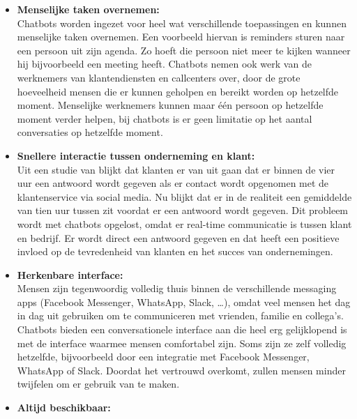 \begin{itemize}
    \item \textbf{Menselijke taken overnemen:} \\
    
    Chatbots worden ingezet voor heel wat verschillende toepassingen en kunnen menselijke taken overnemen. Een voorbeeld hiervan is reminders sturen naar een persoon uit zijn agenda. Zo hoeft die persoon niet meer te kijken wanneer hij bijvoorbeeld een meeting heeft. Chatbots nemen ook werk van de werknemers van klantendiensten en callcenters over, door de grote hoeveelheid mensen die er kunnen geholpen en bereikt worden op hetzelfde moment. Menselijke werknemers kunnen maar één persoon op hetzelfde moment verder helpen, bij chatbots is er geen limitatie op het aantal conversaties op hetzelfde moment. \\
    
    \item \textbf{Snellere interactie tussen onderneming en klant:} \\
    
    Uit een studie van \textcite{Social2016} blijkt dat klanten er van uit gaan dat er binnen de vier uur een antwoord wordt gegeven als er contact wordt opgenomen met de klantenservice via social media. Nu blijkt dat er in de realiteit een gemiddelde van tien uur tussen zit voordat er een antwoord wordt gegeven. Dit probleem wordt met chatbots opgelost, omdat er real-time communicatie is tussen klant en bedrijf. Er wordt direct een antwoord gegeven en dat heeft een positieve invloed op de tevredenheid van klanten en het succes van ondernemingen. \\
    
    \item \textbf{Herkenbare interface:} \\
    
    Mensen zijn tegenwoordig volledig thuis binnen de verschillende messaging apps (Facebook Messenger, WhatsApp, Slack, …), omdat veel mensen het dag in dag uit gebruiken om te communiceren met vrienden, familie en collega’s. Chatbots bieden een conversationele interface aan die heel erg gelijklopend is met de interface waarmee mensen comfortabel zijn. Soms zijn ze zelf volledig hetzelfde, bijvoorbeeld door een integratie met Facebook Messenger, WhatsApp of Slack. Doordat het vertrouwd overkomt, zullen mensen minder twijfelen om er gebruik van te maken. \\
    
    \item \textbf{Altijd beschikbaar:} \\
    

\end{itemize}
